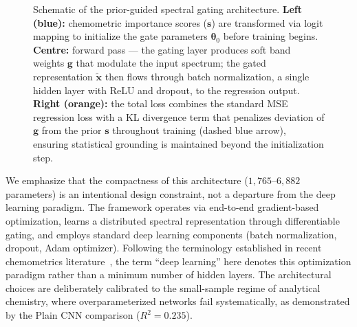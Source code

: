 \documentclass[preprint,12pt]{elsarticle}
\begin{document}
\begin{figure}[ht]
\caption{Schematic of the prior-guided spectral gating architecture.
\textbf{Left (blue):} chemometric importance scores ($\mathbf{s}$) are transformed via
logit mapping to initialize the gate parameters $\boldsymbol{\theta}_0$ before training begins.
\textbf{Centre:} forward pass — the gating layer produces soft band weights $\mathbf{g}$ that
modulate the input spectrum; the gated representation $\tilde{\mathbf{x}}$ then flows through
batch normalization, a single hidden layer with ReLU and dropout, to the regression output.
\textbf{Right (orange):} the total loss combines the standard MSE regression loss with a
KL divergence term that penalizes deviation of $\mathbf{g}$ from the prior $\mathbf{s}$ throughout
training (dashed blue arrow), ensuring statistical grounding is maintained beyond the
initialization step.}
\label{fig:architecture}
\end{figure}

We emphasize that the compactness of this architecture ($1{,}765$--$6{,}882$ parameters) is an intentional design constraint, not a departure from the deep learning paradigm. The framework operates via end-to-end gradient-based optimization, learns a distributed spectral representation through differentiable gating, and employs standard deep learning components (batch normalization, dropout, Adam optimizer). Following the terminology established in recent chemometrics literature~\cite{cui2018modern,acquarelli2017convolutional}, the term ``deep learning'' here denotes this optimization paradigm rather than a minimum number of hidden layers. The architectural choices are deliberately calibrated to the small-sample regime of analytical chemistry, where overparameterized networks fail systematically, as demonstrated by the Plain CNN comparison ($R^2=0.235$).
\end{document}
